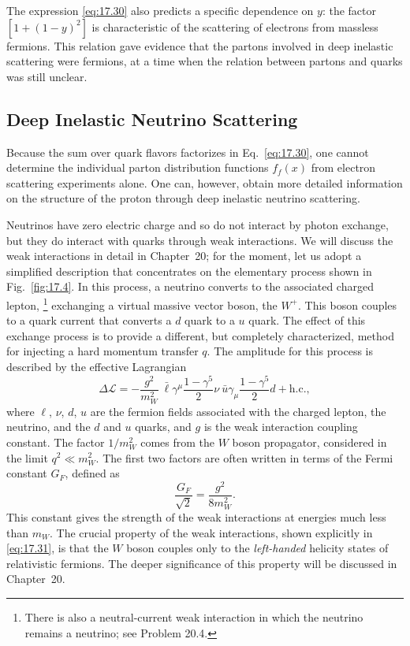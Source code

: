 The expression \eqref{eq:17.30} also predicts a specific dependence on $y$:
the factor $[1 + (1-y)^2]$ is characteristic of the scattering of electrons
from massless fermions.  This relation gave evidence that the partons involved
in deep inelastic scattering were fermions, at a time when the relation
between partons and quarks was still unclear.

\subsection{Deep Inelastic Neutrino Scattering}

Because the sum over quark flavors factorizes in Eq.~\eqref{eq:17.30}, one
cannot determine the individual parton distribution functions $f_f(x)$ from
electron scattering experiments alone.  One can, however, obtain more
detailed information on the structure of the proton through deep inelastic
neutrino scattering.

Neutrinos have zero electric charge and so do not interact by photon
exchange, but they do interact with quarks through weak interactions.  We
will discuss the weak interactions in detail in Chapter~20; for the moment,
let us adopt a simplified description that concentrates on the elementary
process shown in Fig.~\ref{fig:17.4}.  In this process, a neutrino converts
to the associated charged lepton,%
\footnote{There is also a neutral-current weak interaction in which the
neutrino remains a neutrino; see Problem 20.4.} exchanging a virtual massive
vector boson, the $W^{+}$.  This boson couples to a quark current that
converts a $d$ quark to a $u$ quark.  The effect of this exchange process is
to provide a different, but completely characterized, method for injecting a
hard momentum transfer $q$.  The amplitude for this process is described by
the effective Lagrangian
\begin{equation}
  \Delta\mathcal{L} = -\frac{g^2}{m_W^2}\ \bar{\ell}\gamma^\mu
    \frac{1-\gamma^5}{2}\nu\ \bar{u}\gamma_\mu\frac{1-\gamma^5}{2}d
    + \mathrm{h.c.},
  \label{eq:17.31}
\end{equation}
where $\ell$, $\nu$, $d$, $u$ are the fermion fields associated with the
charged lepton, the neutrino, and the $d$ and $u$ quarks, and $g$ is the weak
interaction coupling constant.  The factor $1/m_W^2$ comes from the $W$ boson
propagator, considered in the limit $q^2 \ll m_W^2$.  The first two factors
are often written in terms of the Fermi constant $G_F$, defined as
\begin{equation}
  \frac{G_F}{\sqrt{2}} = \frac{g^2}{8m_W^2} .
  \label{eq:17.32}
\end{equation}
This constant gives the strength of the weak interactions at energies much
less than $m_W$.  The crucial property of the weak interactions, shown
explicitly in \eqref{eq:17.31}, is that the $W$ boson couples only to the
\emph{left-handed} helicity states of relativistic fermions.  The deeper
significance of this property will be discussed in Chapter~20.

